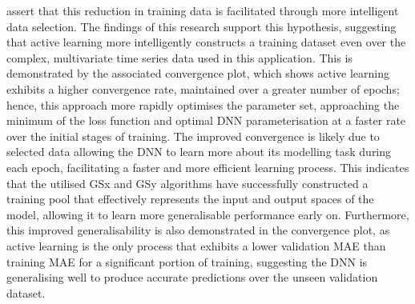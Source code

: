 \documentclass[a4paper, 11pt]{report}
\begin{document}
    \citet{ren-2021} assert that this reduction in training data is facilitated through more intelligent data selection. The findings of this research support this hypothesis, suggesting that active learning more intelligently constructs a training dataset even over the complex, multivariate time series data used in this application. This is demonstrated by the associated convergence plot, which shows active learning exhibits a higher convergence rate, maintained over a greater number of epochs; hence, this approach more rapidly optimises the parameter set, approaching the minimum of the loss function and optimal DNN parameterisation at a faster rate over the initial stages of training. The improved convergence is likely due to selected data allowing the DNN to learn more about its modelling task during each epoch, facilitating a faster and more efficient learning process. This indicates that the utilised GSx and GSy algorithms have successfully constructed a training pool that effectively represents the input and output spaces of the model, allowing it to learn more generalisable performance early on. Furthermore, this improved generalisability is also demonstrated in the convergence plot, as active learning is the only process that exhibits a lower validation MAE than training MAE for a significant portion of training, suggesting the DNN is generalising well to produce accurate predictions over the unseen validation dataset.
\end{document}

